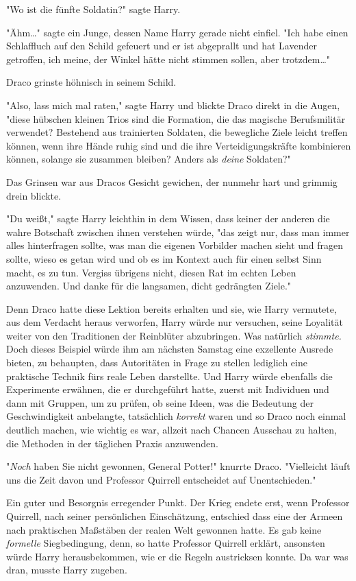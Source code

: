 {"Wo ist die fünfte Soldatin?" sagte Harry.

"Ähm…" sagte ein Junge, dessen Name Harry gerade nicht einfiel. "Ich habe einen Schlaffluch auf den Schild gefeuert und er ist abgeprallt und hat Lavender getroffen, ich meine, der Winkel hätte nicht stimmen sollen, aber trotzdem…"

Draco grinste höhnisch in seinem Schild.

"Also, lass mich mal raten," sagte Harry und blickte Draco direkt in die Augen, "diese hübschen kleinen Trios sind die Formation, die das magische Berufsmilitär verwendet? Bestehend aus trainierten Soldaten, die bewegliche Ziele leicht treffen können, wenn ihre Hände ruhig sind und die ihre Verteidigungskräfte kombinieren können, solange sie zusammen bleiben? Anders als \emph{deine} Soldaten?"

Das Grinsen war aus Dracos Gesicht gewichen, der nunmehr hart und grimmig drein blickte.

"Du weißt," sagte Harry leichthin in dem Wissen, dass keiner der anderen die wahre Botschaft zwischen ihnen verstehen würde, "das zeigt nur, dass man immer alles hinterfragen sollte, was man die eigenen Vorbilder machen sieht und fragen sollte, wieso es getan wird und ob es im Kontext auch für einen selbst Sinn macht, es zu tun. Vergiss übrigens nicht, diesen Rat im echten Leben anzuwenden. Und danke für die langsamen, dicht gedrängten Ziele."

Denn Draco hatte diese Lektion bereits erhalten und sie, wie Harry vermutete, aus dem Verdacht heraus verworfen, Harry würde nur versuchen, seine Loyalität weiter von den Traditionen der Reinblüter abzubringen. Was natürlich \emph{stimmte.} Doch dieses Beispiel würde ihm am nächsten Samstag eine exzellente Ausrede bieten, zu behaupten, dass Autoritäten in Frage zu stellen lediglich eine praktische Technik fürs reale Leben darstellte. Und Harry würde ebenfalls die Experimente erwähnen, die er durchgeführt hatte, zuerst mit Individuen und dann mit Gruppen, um zu prüfen, ob seine Ideen, was die Bedeutung der Geschwindigkeit anbelangte, tatsächlich \emph{korrekt} waren und so Draco noch einmal deutlich machen, wie wichtig es war, allzeit nach Chancen Ausschau zu halten, die Methoden in der täglichen Praxis anzuwenden.

"\emph{Noch} haben Sie nicht gewonnen, General Potter!" knurrte Draco. "Vielleicht läuft uns die Zeit davon und Professor Quirrell entscheidet auf Unentschieden."

Ein guter und Besorgnis erregender Punkt. Der Krieg endete erst, wenn Professor Quirrell, nach seiner persönlichen Einschätzung, entschied dass eine der Armeen nach praktischen Maßstäben der realen Welt gewonnen hatte. Es gab keine \emph{formelle} Siegbedingung, denn, so hatte Professor Quirrell erklärt, ansonsten würde Harry herausbekommen, wie er die Regeln austricksen konnte. Da war was dran, musste Harry zugeben.

}
